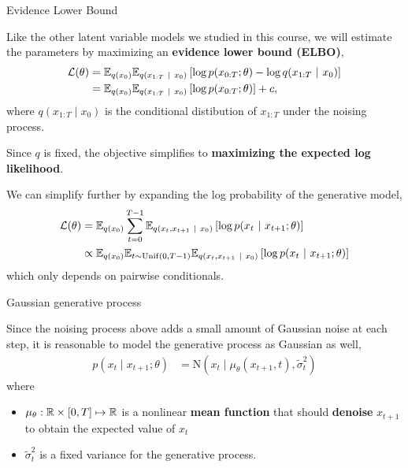 \documentclass[aspectratio=169]{beamer}
\begin{document}
\begin{frame}[t,allowframebreaks]{Evidence Lower Bound}\label{evidence-lower-bound}

Like the other latent variable models we studied in this course, we will
estimate the parameters by maximizing an \textbf{evidence lower bound
(ELBO)}, 
\begin{align*}
\mathcal{L}(\theta) 
&= \mathbb{E}_{q(x_0)} \mathbb{E}_{q(x_{1:T} ~\vert~ x_0)} \left[ \log p(x_{0:T}; \theta) - \log q(x_{1:T} ~\vert~ x_0) \right] \\
&= \mathbb{E}_{q(x_0)} \mathbb{E}_{q(x_{1:T} ~\vert~ x_0)} \left[ \log p(x_{0:T}; \theta)  \right] + c,
\end{align*} 
where \(q(x_{1:T} \mid x_0)\) is the conditional
distibution of \(x_{1:T}\) under the noising process. 

Since $q$ is fixed, the objective simplifies to
\textbf{maximizing the expected log likelihood}.

We can simplify further by expanding the log probability of the
generative model, 
\begin{align*}
\mathcal{L}(\theta)
&= \mathbb{E}_{q(x_0)} \sum_{t=0}^{T-1} \mathbb{E}_{q(x_t, x_{t+1} ~\vert~ x_0)} \left[  \log p(x_t ~\vert~ x_{t+1}; \theta) \right] \\
&\propto \mathbb{E}_{q(x_0)} \mathbb{E}_{t \sim \mathrm{Unif}(0,T-1)} \mathbb{E}_{q(x_t, x_{t+1} ~\vert~ x_0)} \left[ \log p(x_t ~\vert~ x_{t+1}; \theta) \right]
\end{align*} 
which only depends on pairwise conditionals.
\end{frame}

\begin{frame}[t,allowframebreaks]{Gaussian generative
process}\label{gaussian-generative-process}

Since the noising process above adds a small amount of Gaussian noise at
each step, it is reasonable to model the generative process as Gaussian
as well, 
\begin{align*}
p(x_t \mid x_{t+1}; \theta) 
&= 
\mathrm{N}(x_t \mid \mu_\theta(x_{t+1}, t), \widetilde{\sigma}_t^2)
\end{align*} 
where 
\begin{itemize}
    \item \(\mu_\theta: \mathbb{R} \times [0,T] \mapsto \mathbb{R}\) is
a nonlinear \textbf{mean function} that should \textbf{denoise}
\(x_{t+1}\) to obtain the expected value of \(x_t\)
    \item \(\widetilde{\sigma}_t^2\) is a fixed variance for the generative
process.
\end{itemize}
\end{frame}
\end{document}
